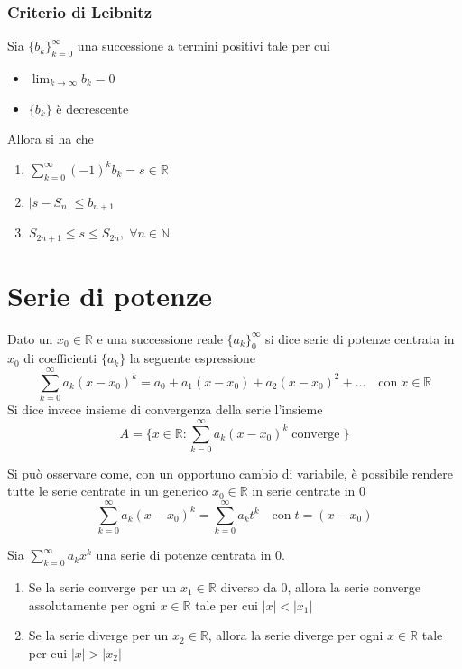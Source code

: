             \subsubsection{Criterio di Leibnitz}
                Sia $\{b_{k}\}_{k = 0}^{\infty}$ una successione a termini positivi tale per cui
                \begin{itemize}
                    \item $\displaystyle \lim_{k \rightarrow \infty} b_{k} = 0$
                    \item $\{b_{k}\}$ è decrescente
                \end{itemize}
                Allora si ha che
                \begin{enumerate}[label=(\arabic*)]
                    \item $\displaystyle \sum_{k = 0}^{\infty} (-1)^{k} b_{k} = s \in \mathbb{R}$
                    \item $|s - S_{n}| \leq b_{n + 1}$
                    \item $S_{2n + 1} \leq s \leq S_{2n}, \; \forall n \in \mathbb{N}$
                \end{enumerate}




    \section{Serie di potenze}
        Dato un $x_{0} \in \mathbb{R}$ e una successione reale $\{a_{k}\}_{0}^{\infty}$ si dice serie di potenze centrata in $x_{0}$ di coefficienti $\{a_{k}\}$ la seguente espressione
        \[
            \sum_{k = 0}^{\infty} a_{k}(x - x_{0})^{k} = a_{0} + a_{1}(x - x_{0}) + a_{2}(x - x_{0})^{2} + ...  \quad \text{con} \; x \in \mathbb{R}
        \]
        Si dice invece insieme di convergenza della serie l'insieme
        \[
            A = \{ x \in \mathbb{R} : \sum_{k = 0}^{\infty} a_{k}(x - x_{0})^{k} \; \text{converge} \; \}
        \]

        Si può osservare come, con un opportuno cambio di variabile, è possibile rendere tutte le serie centrate in un generico $x_{0} \in \mathbb{R}$ in serie centrate in $0$
        \[
            \sum_{k = 0}^{\infty} a_{k}(x - x_{0})^{k} = \sum_{k = 0}^{\infty} a_{k}t^{k} \quad \text{con} \; t = (x - x_{0})
        \]

        \begin{theorem}
            Sia $\sum_{k = 0}^{\infty} a_{k}x^{k}$ una serie di potenze centrata in $0$.
            \begin{enumerate}
                \item Se la serie converge per un $x_{1} \in \mathbb{R}$ diverso da $0$, allora la serie converge assolutamente per ogni $x \in \mathbb{R}$ tale per cui $|x| < |x_{1}|$
                \item Se la serie diverge per un $x_{2} \in \mathbb{R}$, allora la serie diverge per ogni $x \in \mathbb{R}$ tale per cui $|x| > |x_{2}|$
            \end{enumerate}
        \end{theorem}

